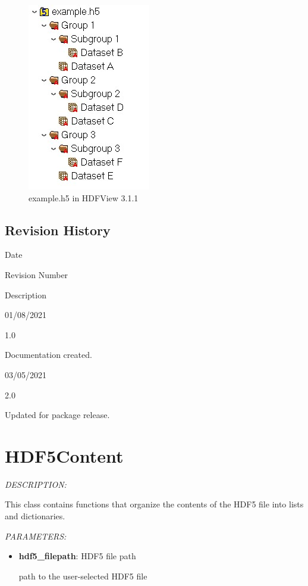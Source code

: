 \documentclass[
]{article}
\begin{document}
\begin{figure}
\centering
\includegraphics{resources/example_file_structure.jpg}
\caption{example.h5 in HDFView 3.1.1}
\end{figure}

\hypertarget{revision-history}{%
\subsection{Revision History}\label{revision-history}}

Date

Revision Number

Description

01/08/2021

1.0

Documentation created.

03/05/2021

2.0

Updated for package release.

\hypertarget{hdf5content}{%
\section{HDF5Content}\label{hdf5content}}

\emph{DESCRIPTION:}

This class contains functions that organize the contents of the HDF5 file into lists and dictionaries.

\emph{PARAMETERS:}

\begin{itemize}
\item
  \textbf{hdf5\_filepath}: HDF5 file path

  path to the user-selected HDF5 file
\end{itemize}
\end{document}

